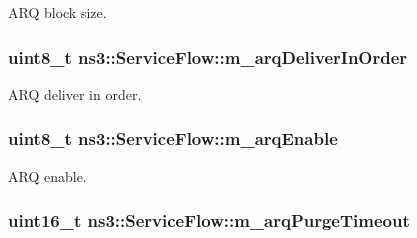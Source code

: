 A\+RQ block size. 

\subsubsection[{\texorpdfstring{m\+\_\+arq\+Deliver\+In\+Order}{m_arqDeliverInOrder}}]{\setlength{\rightskip}{0pt plus 5cm}uint8\+\_\+t ns3\+::\+Service\+Flow\+::m\+\_\+arq\+Deliver\+In\+Order\hspace{0.3cm}{\ttfamily [private]}}\hypertarget{classns3_1_1ServiceFlow_a63a1bcb8d446692d8ebec06d9119d6e2}{}\label{classns3_1_1ServiceFlow_a63a1bcb8d446692d8ebec06d9119d6e2}


A\+RQ deliver in order. 

\subsubsection[{\texorpdfstring{m\+\_\+arq\+Enable}{m_arqEnable}}]{\setlength{\rightskip}{0pt plus 5cm}uint8\+\_\+t ns3\+::\+Service\+Flow\+::m\+\_\+arq\+Enable\hspace{0.3cm}{\ttfamily [private]}}\hypertarget{classns3_1_1ServiceFlow_abbea8cd5abb577970a936459f71f4c07}{}\label{classns3_1_1ServiceFlow_abbea8cd5abb577970a936459f71f4c07}


A\+RQ enable. 

\subsubsection[{\texorpdfstring{m\+\_\+arq\+Purge\+Timeout}{m_arqPurgeTimeout}}]{\setlength{\rightskip}{0pt plus 5cm}uint16\+\_\+t ns3\+::\+Service\+Flow\+::m\+\_\+arq\+Purge\+Timeout\hspace{0.3cm}{\ttfamily [private]}}\hypertarget{classns3_1_1ServiceFlow_a92fcfb80bb43ffe252aea99e8a51593b}{}\label{classns3_1_1ServiceFlow_a92fcfb80bb43ffe252aea99e8a51593b}


